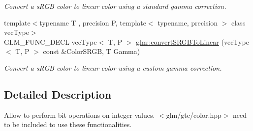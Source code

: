 \begin{DoxyCompactItemize}
\begin{DoxyCompactList}\small\item\em Convert a s\-R\-G\-B color to linear color using a standard gamma correction. \end{DoxyCompactList}\item 
\hypertarget{group__gtc__color__space_ga61c4f0efdf55c29d9cfbd26141fddef8}{{\footnotesize template$<$typename T , precision P, template$<$ typename, precision $>$ class vec\-Type$>$ }\\G\-L\-M\-\_\-\-F\-U\-N\-C\-\_\-\-D\-E\-C\-L vec\-Type$<$ T, P $>$ \hyperlink{group__gtc__color__space_ga61c4f0efdf55c29d9cfbd26141fddef8}{glm\-::convert\-S\-R\-G\-B\-To\-Linear} (vec\-Type$<$ T, P $>$ const \&Color\-S\-R\-G\-B, T Gamma)}\label{group__gtc__color__space_ga61c4f0efdf55c29d9cfbd26141fddef8}

\begin{DoxyCompactList}\small\item\em Convert a s\-R\-G\-B color to linear color using a custom gamma correction. \end{DoxyCompactList}\end{DoxyCompactItemize}


\subsection{Detailed Description}
Allow to perform bit operations on integer values. $<$glm/gtc/color.\-hpp$>$ need to be included to use these functionalities. 